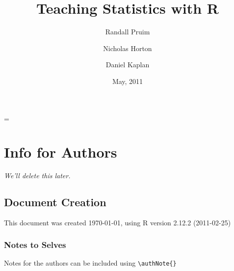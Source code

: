 \documentclass[twoside]{report}
\title{Teaching Statistics with R}
\author{
Randall Pruim
\and
Nicholas Horton 
\and 
Daniel Kaplan 
}
\date{May, 2011}
\begin{document}
\newif\ifhweave
\ifdef{\hlcomment}{\hweavetrue}{\hweavefalse}
\ifhweave
\renewenvironment{Hchunk}%
{%
\vspace{0.5em}\noindent\begin{lrbox}{\highlightbox}%
\begin{minipage}[b]{\Rwidth}%
}%
{%
\end{minipage}%
\end{lrbox}%
\fcolorbox{highlightBg}{highlightBg}{\usebox{\highlightbox}}%
\vspace{0.5em}}%

\renewcommand{\hlcomment}[1]{\textcolor[rgb]{0.4,0.4,0.3}{#1}}%
\fi
\Rwidth=\textwidth

\parindent=0pt
\parskip=3mm





\maketitle

\tableofcontents

\chapter*{Info for Authors}

\begin{center}
\it
We'll delete this later.
\end{center}

\section*{Document Creation}


This document was created
\today, using 
R version 2.12.2 (2011-02-25) 

\subsection*{Notes to Selves}

Notes for the authors can be included using \verb!\authNote{}!
\end{document}
